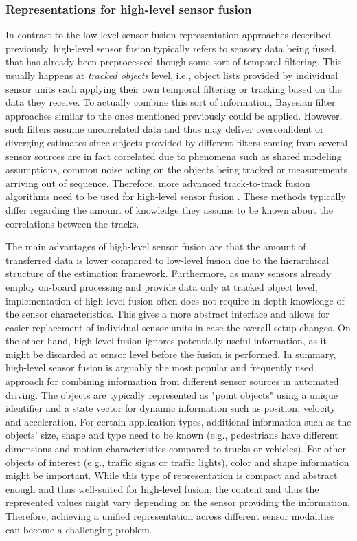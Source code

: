 \subsubsection{Representations for high-level sensor fusion}
In contrast to the low-level sensor fusion representation approaches described previously, high-level sensor fusion typically refers to sensory data being fused, that has already been preprocessed though some sort of temporal filtering.
This usually happens at \emph{tracked objects} level, i.e., object lists provided by individual sensor units each applying their own temporal filtering or tracking based on the data they receive.
To actually combine this sort of information, Bayesian filter approaches similar to the ones mentioned previously could be applied. 
However, such filters assume uncorrelated data and thus may deliver overconfident or diverging estimates since objects provided by different filters coming from several sensor sources are in fact correlated due to phenomena such as shared modeling assumptions, common noise acting on the objects being tracked or measurements arriving out of sequence.
Therefore, more advanced track-to-track fusion algorithms need to be used for high-level sensor fusion \cite{Tian2010, Aeberhard2012}.
These methods typically differ regarding the amount of knowledge they assume to be known about the correlations between the tracks.

The main advantages of high-level sensor fusion are that the amount of transferred data is lower compared to low-level fusion due to the hierarchical structure of the estimation framework.
Furthermore, as many sensors already employ on-board processing and provide data only at tracked object level, implementation of high-level fusion often does not require in-depth knowledge of the sensor characteristics.
This gives a more abstract interface and allows for easier replacement of individual sensor units in case the overall setup changes.
On the other hand, high-level fusion ignores potentially useful information, as it might be discarded at sensor level before the fusion is performed.
In summary, high-level sensor fusion is arguably the most popular and frequently used approach for combining information from different sensor sources in automated driving.
The objects are typically represented as "point objects" using a unique identifier and a state vector for dynamic information such as position, velocity and acceleration.
For certain application types, additional information such as the objects' size, shape and type need to be known (e.g., pedestrians have different dimensions and motion characteristics compared to trucks or vehicles).
For other objects of interest (e.g., traffic signs or traffic lights), color and shape information might be important.
While this type of representation is compact and abstract enough and thus well-suited for high-level fusion, the content and thus the represented values might vary depending on the sensor providing the information.
Therefore, achieving a unified representation across different sensor modalities can become a challenging problem.

